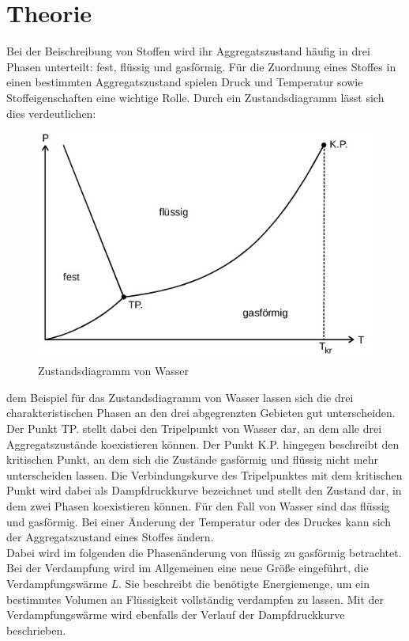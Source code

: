 \section{Theorie}\justifying
Bei der Beischreibung von Stoffen wird ihr Aggregatszustand häufig in drei 
Phasen unterteilt: fest, flüssig und gasförmig. 
Für die Zuordnung eines Stoffes in einen bestimmten Aggregatszustand spielen
Druck und Temperatur sowie Stoffeigenschaften eine wichtige Rolle.
Durch ein Zustandsdiagramm lässt sich dies verdeutlichen:
\begin{figure}[H]
    \centering
    \includegraphics[width=0.75\linewidth]{./images/zustand.jpg}
    \caption{Zustandsdiagramm von Wasser \cite{V203}}
    \label{fig:1}
\end{figure}
\justifying dem Beispiel für das Zustandsdiagramm von Wasser lassen sich die drei
charakteristischen Phasen an den drei abgegrenzten Gebieten gut unterscheiden.
Der Punkt TP. stellt dabei den Tripelpunkt von Wasser dar, an dem alle drei Aggregatszustände
koexistieren können. Der Punkt K.P. hingegen beschreibt den kritischen Punkt, an dem sich
die Zustände gasförmig und flüssig nicht mehr unterscheiden lassen. Die Verbindungskurve
des Tripelpunktes mit dem kritischen Punkt wird dabei als Dampfdruckkurve bezeichnet und
stellt den Zustand dar, in dem zwei Phasen koexistieren können.
Für den Fall von Wasser sind das flüssig und gasförmig.
Bei einer Änderung der Temperatur oder des Druckes kann sich der Aggregatszustand eines
Stoffes ändern. \\
Dabei wird im folgenden die Phasenänderung von flüssig zu gasförmig betrachtet.
Bei der Verdampfung wird im Allgemeinen eine neue Größe eingeführt, die Verdampfungswärme $L$.
Sie beschreibt die benötigte Energiemenge, um ein bestimmtes Volumen an Flüssigkeit vollständig
verdampfen zu lassen. Mit der Verdampfungswärme wird ebenfalls der Verlauf der Dampfdruckkurve beschrieben.
